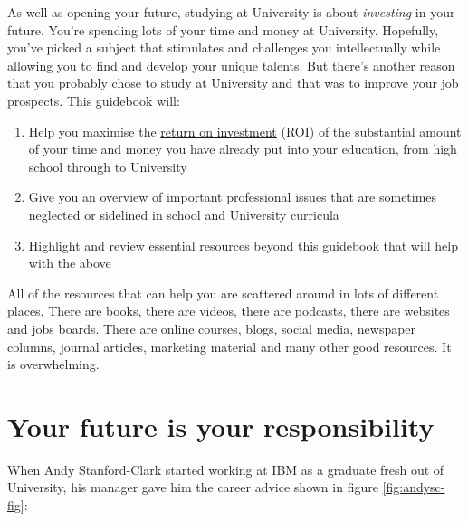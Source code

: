 \documentclass[
]{book}
\providecommand{\tightlist}{%
  \setlength{\itemsep}{0pt}\setlength{\parskip}{0pt}}
\begin{document}
As well as opening your future, studying at University is about \emph{investing} in your future. You're spending lots of your time and money at University. Hopefully, you've picked a subject that stimulates and challenges you intellectually while allowing you to find and develop your unique talents. But there's another reason that you probably chose to study at University and that was to improve your job prospects. This guidebook will:

\begin{enumerate}
\def\labelenumi{\arabic{enumi}.}
\tightlist
\item
  Help you maximise the \href{https://en.wikipedia.org/wiki/Return_on_investment}{return on investment} (ROI) of the substantial amount of your time and money you have already put into your education, from high school through to University
\item
  Give you an overview of important professional issues that are sometimes neglected or sidelined in school and University curricula
\item
  Highlight and review essential resources beyond this guidebook that will help with the above
\end{enumerate}

All of the resources that can help you are scattered around in lots of different places. There are books, there are videos, there are podcasts, there are websites and jobs boards. There are online courses, blogs, social media, newspaper columns, journal articles, marketing material and many other good resources. It is overwhelming.

\hypertarget{responsibility}{%
\section{Your future is your responsibility}\label{responsibility}}

When Andy Stanford-Clark started working at IBM as a graduate fresh out of University, his manager gave him the career advice shown in figure \ref{fig:andysc-fig}:
\end{document}
